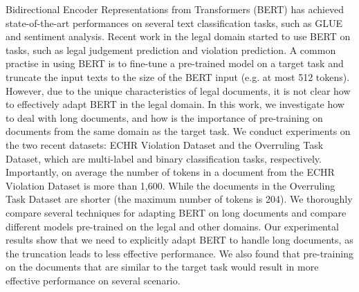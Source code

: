 Bidirectional Encoder Representations from Transformers (BERT) has achieved state-of-the-art performances on several text classification tasks, such as GLUE and sentiment analysis. Recent work in the legal domain started to use BERT on tasks, such as legal judgement prediction and violation prediction. A common practise in using BERT is to fine-tune a pre-trained model on a target task and truncate the input texts to the size of the BERT input (e.g. at most 512 tokens). However, due to the unique characteristics of legal documents, it is not clear how to effectively adapt BERT in the legal domain. In this work, we investigate how to deal with long documents, and how is the importance of pre-training on documents from the same domain as the target task. We conduct experiments on the two recent datasets: ECHR Violation Dataset and the Overruling Task Dataset, which are multi-label and binary classification tasks, respectively. Importantly, on average the number of tokens in a document from the ECHR Violation Dataset is more than 1,600. While the documents in the Overruling Task Dataset are shorter (the maximum number of tokens is 204). We thoroughly compare several techniques for adapting BERT on long documents and compare different models pre-trained on the legal and other domains. Our experimental results show that we need to explicitly adapt BERT to handle long documents, as the truncation leads to less effective performance. We also found that pre-training on the documents that are similar to the target task would result in more effective performance on several scenario.
